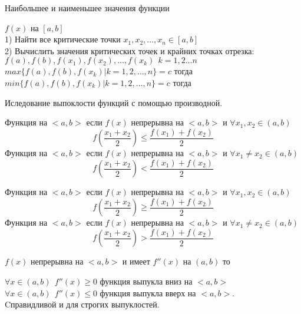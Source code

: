 \begin{title}[\Large]
  Наибольшее и наименьшее значения функции
\end{title}
$f(x)$ на $[a,b]$\\
1) Найти все критические точки $x_1, x_2, \ldots, x_n \in [a, b]$\\
2) Вычислить значения критических точек и крайних точках отрезка:\\
$f(a), f(b), f(x_1), f(x_2), \ldots, f(x_k) ~~ k = 1, 2 \ldots n$\\
$max \{f(a), f(b), f(x_k) | k = 1, 2, \ldots, n\} = c $ тогда \\
$min \{f(a), f(b), f(x_k) | k = 1, 2, \ldots, n\} = c $ тогда 

\begin{title}[\Large]
  Иследование выпоклости функций с помощью производной.
\end{title}

\begin{defin}
  Функция  на $<a,b>$ если $f(x)$ непрерывна
  на $<a,b>$ и $\forall x_1, x_2 \in (a,b)$
  \[f(\frac{x_1 + x_2}{2}) \le \frac{f(x_1) + f(x_2)}{2}\]
  Функция  на $<a,b>$ если $f(x)$ непрерывна
  на $<a,b>$ и
  $\forall x_1 \not= x_2 \in (a,b)$
  \[f(\frac{x_1 + x_2}{2}) < \frac{f(x_1) + f(x_2)}{2}\]
\end{defin}

\begin{defin}
  Функция  на $<a,b>$ если $f(x)$ непрерывна
  на $<a,b>$ и $\forall x_1, x_2 \in (a,b)$
  \[f(\frac{x_1 + x_2}{2}) \ge \frac{f(x_1) + f(x_2)}{2}\]
  Функция  на $<a,b>$ если $f(x)$ непрерывна
  на $<a,b>$ и
  $\forall x_1 \not= x_2 \in (a,b)$
  \[f(\frac{x_1 + x_2}{2}) > \frac{f(x_1) + f(x_2)}{2}\]
\end{defin}

\begin{theorem}
  $f(x)$ непрерывна на $<a,b>$ и имеет $f''(x)$ на $(a,b)$ то

  $\forall x \in (a,b) ~~ f''(x) \ge 0$ функция выпукла вниз на $<a,b>$\\
  $\forall x \in (a,b) ~~ f''(x) \le 0$ функция выпукла вверх на $<a,b>$.\\
  Cправидливой и для строгих выпуклостей.
\end{theorem}


